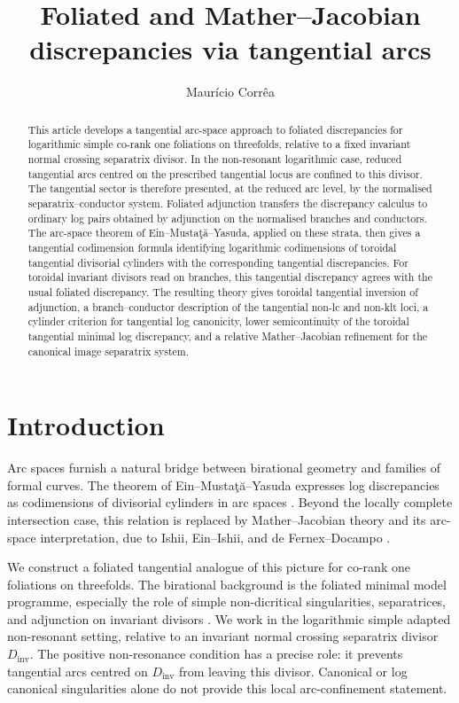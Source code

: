 \documentclass[11pt]{amsart}
\title[Foliated and Mather--Jacobian discrepancies]{Foliated and Mather--Jacobian discrepancies via tangential arcs}
\author[M. Corr\^ea]{Maur\'icio Corr\^ea}
\numberwithin{equation}{section}
\theoremstyle{plain}
\theoremstyle{definition}
\newcommand{\Dinv}{D_{\mathrm{inv}}}
\begin{document}
\begin{abstract}
This article develops a tangential arc-space approach to foliated discrepancies
for logarithmic simple co-rank one foliations on threefolds, relative to a
fixed invariant normal crossing separatrix divisor.  In the non-resonant
logarithmic case, reduced tangential arcs centred on the prescribed
tangential locus are confined to this divisor.  The tangential sector is
therefore presented, at the reduced arc level, by the normalised
separatrix--conductor system.  Foliated adjunction transfers the discrepancy
calculus to ordinary log pairs obtained by adjunction on the normalised
branches and conductors.  The arc-space theorem of
Ein--Musta\c{t}\u{a}--Yasuda, applied on these strata, then gives a
tangential codimension formula identifying logarithmic codimensions of
toroidal tangential divisorial cylinders with the corresponding tangential
discrepancies.  For toroidal invariant divisors read on branches, this
tangential discrepancy agrees with the usual foliated discrepancy.  The
resulting theory gives toroidal tangential inversion of adjunction, a
branch--conductor description of the tangential non-lc and non-klt loci, a
cylinder criterion for tangential log canonicity, lower semicontinuity of the
toroidal tangential minimal log discrepancy, and a relative Mather--Jacobian
refinement for the canonical image separatrix system.
\end{abstract}


\maketitle



\section{Introduction}

Arc spaces furnish a natural bridge between birational geometry and families
of formal curves.  The theorem of Ein--Musta\c{t}\u{a}--Yasuda expresses log
discrepancies as codimensions of divisorial cylinders in arc spaces
\cite{EMY}.  Beyond the locally complete intersection case, this relation is
replaced by Mather--Jacobian theory and its arc-space interpretation, due to
Ishii, Ein--Ishii, and de Fernex--Docampo \cite{IshiiMather,EI,dFD}.

We construct a foliated tangential analogue of this picture for co-rank one
foliations on threefolds.  The birational background is the foliated minimal
model programme, especially the role of simple non-dicritical singularities,
separatrices, and adjunction on invariant divisors
\cite{CSMMP,Spicer,SS,CSAdj}.  We work in the logarithmic simple adapted
non-resonant setting, relative to an invariant normal crossing separatrix
divisor \(\Dinv\).  The positive non-resonance condition has a precise role:
it prevents tangential arcs centred on \(\Dinv\) from leaving this divisor.
Canonical or log canonical singularities alone do not provide this local
arc-confinement statement.
\end{document}
